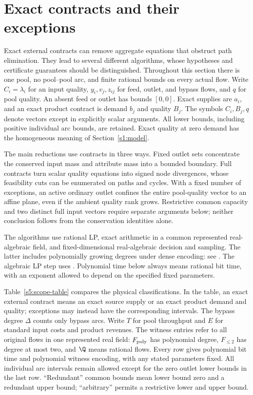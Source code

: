 \section{Exact contracts and their exceptions}\label{s5:contracts}

Exact external contracts can remove aggregate equations that obstruct
path elimination. They lead to several different algorithms, whose
hypotheses and certificate guarantees should be distinguished. Throughout
this section there is one pool, no pool--pool arc, and finite rational
bounds on every actual flow. Write $C_i=\lambda_i$ for an input quality,
$y_i,v_j,z_{ij}$ for feed, outlet, and bypass flows, and $q$ for pool
quality. An absent feed or outlet has bounds $[0,0]$. Exact supplies are
$a_i$, and an exact product contract is demand $b_j$ and quality $B_j$.
The symbols $C_i,B_j,q$ denote vectors except in explicitly scalar
arguments. All lower bounds, including positive individual arc bounds,
are retained. Exact quality at zero demand has the homogeneous meaning
of Section~\ref{s1:model}.

The main reductions use contracts in three ways. Fixed outlet sets
concentrate the conserved input mass and attribute mass into a bounded
boundary. Full contracts turn scalar quality equations into signed
node divergences, whose feasibility cuts can be enumerated on paths
and cycles. With a fixed number of exceptions, an active ordinary
outlet confines the entire pool-quality vector to an affine plane,
even if the ambient quality rank grows. Restrictive common capacity
and two distinct full input vectors require separate arguments below;
neither conclusion follows from the conservation identities alone.

The algorithms use rational LP, exact arithmetic in a common represented
real-algebraic field, and fixed-dimensional real-algebraic decision and
sampling. The latter includes polynomially growing degrees under dense
encoding: see \citet[Theorem~1.3.1 and Sections~3.1.3--3.2]
{basu1996-on-the-combinatorial-and-algebraic}. The algebraic LP step uses
\citet[Section~5, Remark~1]{s4:adler1994}. Polynomial time below always
means rational bit time, with an exponent allowed to depend on the
specified fixed parameters.

Table~\ref{s5:scope-table} compares the physical classifications. In the
table, an exact external contract means an exact source supply or an
exact product demand and quality; exceptions may instead have the
corresponding intervals. The bypass degree $\Delta$ counts only bypass
arcs. Write $T$ for pool throughput and $E$ for standard input costs
and product revenues. The witness entries refer to all original flows
in one represented real field: $F_{\rm poly}$ has polynomial degree,
$F_{\le2}$ has degree at most two, and $\Q$ means rational flows.
Every row gives polynomial bit time and polynomial witness encoding,
with any stated parameters fixed. All individual arc intervals remain
allowed except for the zero outlet lower bounds in the last row.
``Redundant'' common bounds mean lower bound zero and a redundant upper
bound; ``arbitrary'' permits a restrictive lower and upper bound.

